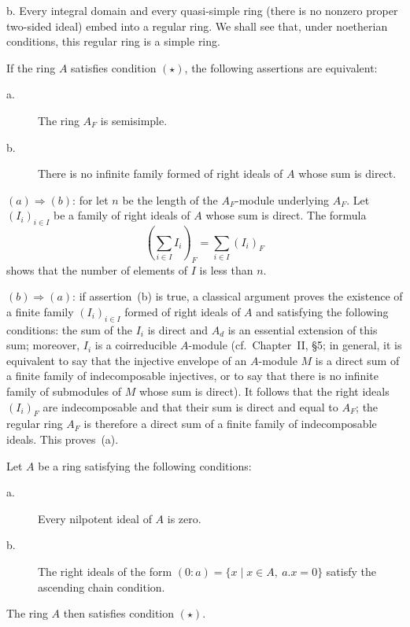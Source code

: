 b. Every integral domain and every quasi-simple ring (there is no
nonzero proper two-sided ideal) embed into a regular ring. We shall see
that, under noetherian conditions, this regular ring is a simple ring.

\begin{lemma}
If the ring $A$ satisfies condition $(\star)$, the following assertions
are equivalent:
\begin{description}
\item[\normalfont a.] The ring $A_F$ is semisimple.
\item[\normalfont b.] There is no infinite family formed of right ideals
of $A$ whose sum is direct.
\end{description}
\end{lemma}

$(a)\Rightarrow(b)$: for let $n$ be the length of the $A_F$-module
underlying $A_F$. Let $(I_i)_{i\in I}$ be a family of right ideals of
$A$ whose sum is direct. The formula
\[
\left(\sum_{i\in I}I_i\right)_{F}=\sum_{i\in I}(I_i)_{F}
\]
shows that the number of elements of $I$ is less than $n$.

$(b)\Rightarrow(a)$: if assertion~(b) is true, a classical argument
proves the existence of a finite family $(I_i)_{i\in I}$ formed of right
ideals of $A$ and satisfying the following conditions: the sum of the
$I_i$ is direct and $A_d$ is an essential extension of this sum;
moreover, $I_i$ is a coirreducible $A$-module (cf.\ Chapter~II, \S5; in
general, it is equivalent to say that the injective envelope of an
$A$-module $M$ is a direct sum of a finite family of indecomposable
injectives, or to say that there is no infinite family of submodules of
$M$ whose sum is direct). It follows that the right ideals
$(I_i)_{F}$ are indecomposable and that their sum is direct and equal
to $A_F$; the regular ring $A_F$ is therefore a direct sum of a finite
family of indecomposable ideals. This proves~(a).

\begin{lemma}
Let $A$ be a ring satisfying the following conditions:
\begin{description}
\item[\normalfont a.] Every nilpotent ideal of $A$ is zero.
\item[\normalfont b.] The right ideals of the form
$(0:a)=\{x\mid x\in A,\ a.x=0\}$ satisfy the ascending chain condition.
\end{description}
The ring $A$ then satisfies condition $(\star)$.
\end{lemma}

